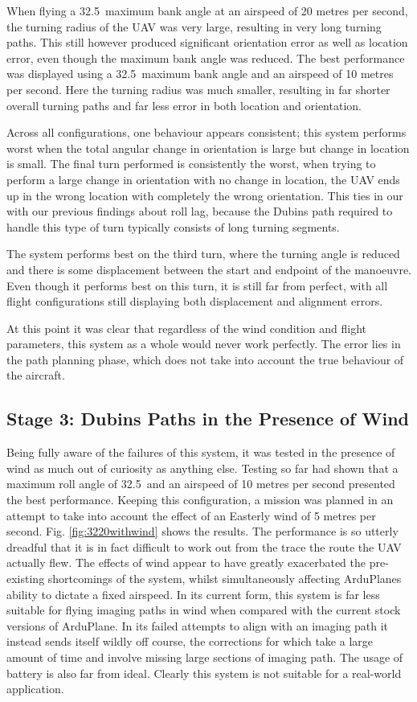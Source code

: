When flying a 32.5\degree\ maximum bank angle at an airspeed of 20 metres per second, the turning radius of the UAV was very large, resulting in very long turning paths. This still however produced significant orientation error as well as location error, even though the maximum bank angle was reduced. The best performance was displayed using a 32.5\degree\ maximum bank angle and an airspeed of 10 metres per second. Here the turning radius was much smaller, resulting in far shorter overall turning paths and far less error in both location and orientation. 

Across all configurations, one behaviour appears consistent; this system performs worst when the total angular change in orientation is large but change in location is small. The final turn performed is consistently the worst, when trying to perform a large change in orientation with no change in location, the UAV ends up in the wrong location with completely the wrong orientation. This ties in our with our previous findings about roll lag, because the Dubins path required to handle this type of turn typically consists of long turning segments. 

The system performs best on the third turn, where the turning angle is reduced and there is some displacement between the start and endpoint of the manoeuvre. Even though it performs best on this turn, it is still far from perfect, with all flight configurations still displaying both displacement and alignment errors. 

At this point it was clear that regardless of the wind condition and flight parameters, this system as a whole would never work perfectly. The error lies in the path planning phase, which does not take into account the true behaviour of the aircraft. 

\subsection{Stage 3: Dubins Paths in the Presence of Wind}
\label{task2:wind}

Being fully aware of the failures of this system, it was tested in the presence of wind as much out of curiosity as anything else. Testing so far had shown that a maximum roll angle of 32.5\degree\ and an airspeed of 10 metres per second presented the best performance. Keeping this configuration, a mission was planned in an attempt to take into account the effect of an Easterly wind of 5 metres per second. Fig. \ref{fig:3220withwind} shows the results. The performance is so utterly dreadful that it is in fact difficult to work out from the trace the route the UAV actually flew. The effects of wind appear to have greatly exacerbated the pre-existing shortcomings of the system, whilst simultaneously affecting ArduPlanes ability to dictate a fixed airspeed. In its current form, this system is far less suitable for flying imaging paths in wind when compared with the current stock versions of ArduPlane. In its failed attempts to align with an imaging path it instead sends itself wildly off course, the corrections for which take a large amount of time and involve missing large sections of imaging path. The usage of battery is also far from ideal. Clearly this system is not suitable for a real-world application. 

